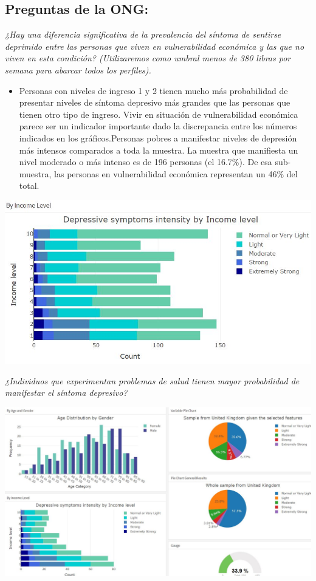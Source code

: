 \documentclass{report}
\begin{document}
\subsection{Preguntas de la ONG:} 


\textit{¿Hay una diferencia significativa de la prevalencia del síntoma de sentirse deprimido entre las personas que viven en vulnerabilidad económica y las que no viven en esta condición? (Utilizaremos como umbral menos de 380 libras por semana para abarcar todos los perfiles).} 


\begin{itemize}
\item Personas con niveles de ingreso 1 y 2 tienen mucho más probabilidad de presentar niveles de síntoma depresivo más grandes que las personas que tienen otro tipo de ingreso. Vivir en situación de vulnerabilidad económica parece ser un indicador importante dado la discrepancia entre los números indicados en los gráficos.Personas pobres a manifestar niveles de depresión más intensos comparados a toda la muestra. La muestra que manifiesta un nivel moderado o más intenso es de 196 personas (el 16.7\%). De esa sub-muestra, las personas en vulnerabilidad económica representan un 46\% del total.
\end{itemize}

\includegraphics[width=1\textwidth]{dep_by_income.JPG}



\textit{¿Individuos que experimentan problemas de salud tienen mayor probabilidad de 
manifestar el síntoma depresivo? }

\includegraphics[width=1\textwidth]{dep_hampered.JPG}
\end{document}
